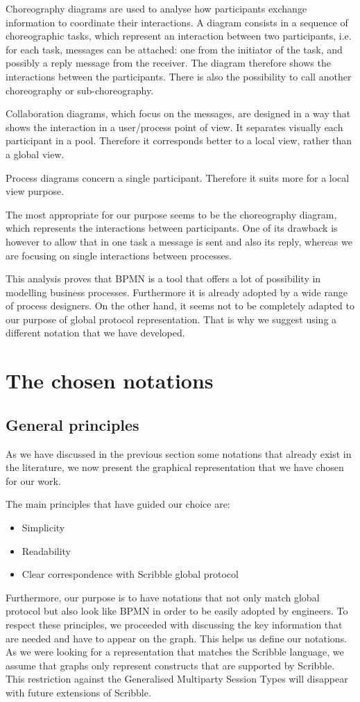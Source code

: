 \documentclass[a4paper,11pt,twoside]{report}
\begin{document}
Choreography diagrams are used to analyse how participants exchange information to coordinate their interactions. A diagram consists in a sequence of choreographic tasks, which represent an interaction between two participants, i.e. for each task, messages can be attached: one from the initiator of the task, and possibly a reply message from the receiver. The diagram therefore shows the interactions between the participants. There is also the possibility to call another choreography or sub-choreography.

Collaboration diagrams, which focus on the messages, are designed in a way that shows the interaction in a user/process point of view. It separates visually each participant in a pool. Therefore it corresponds better to a local view, rather than a global view.

Process diagrams concern a single participant. Therefore it suits more for a local view purpose.

The most appropriate for our purpose seems to be the choreography diagram, which represents the interactions between participants. One of its drawback is however to allow that in one task a message is sent and also its reply, whereas we are focusing on single interactions between processes.

This analysis proves that BPMN is a tool that offers a lot of possibility in modelling business processes. Furthermore it is already adopted by a wide range of process designers. On the other hand, it seems not to be completely adapted to our purpose of global protocol representation. That is why we suggest using a different notation that we have developed.


\section{The chosen notations}

\subsection{General principles}
As we have discussed in the previous section some notations that already exist in the literature, we now present the graphical representation that we have chosen for our work.

The main principles that have guided our choice are:
\begin{itemize}
\item Simplicity
\item Readability
\item Clear correspondence with Scribble global protocol
\end{itemize}
Furthermore, our purpose is to have notations that not only match global protocol but also look like BPMN in order to be easily adopted by engineers. To respect these principles, we proceeded with discussing the key information that are needed and have to appear on the graph. This helps us define our notations. As we were looking for a representation that matches the Scribble language, we assume that graphs only represent constructs that are supported by Scribble. This restriction against the Generalised Multiparty Session Types will disappear with future extensions of Scribble.
\end{document}

